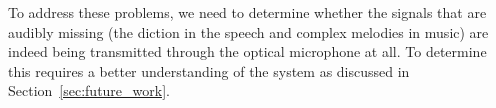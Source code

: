 \documentclass[paper-main.tex]{subfiles}
\begin{document}
To address these problems, we need to determine whether the signals that are audibly missing (the diction in the speech and complex melodies in music) are indeed being transmitted through the optical microphone at all. 
To determine this requires a better understanding of the system as discussed in Section~\ref{sec:future_work}.



\end{document}
